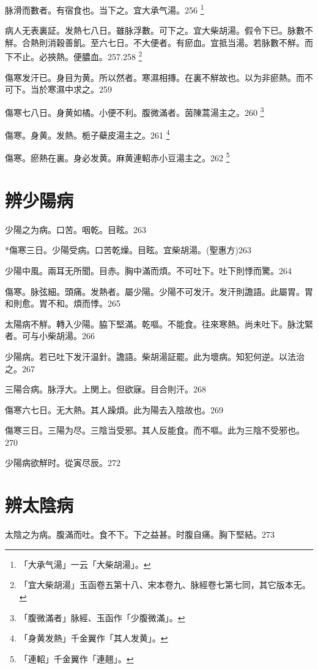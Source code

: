 \documentclass[12pt,twoside,UTF8,b5paper]{ctexbook}
\begin{document}
脉滑而數者。有宿食也。当下之。宜{大}承气湯。256
	\footnote{「大承气湯」一云「大柴胡湯」。}

病人无表裏証。发熱七八日。雖脉浮數。可下之。{宜大柴胡湯。}假令下已。脉數不觧。合熱則消穀善飢。至六七日。不大便者。有瘀血。宜抵当湯。若脉數不觧。而下不止。必挾熱。便膿血。257.258
	\footnote{「宜大柴胡湯」玉函卷五第十八、宋本卷九、脉經卷七第七同，其它版本无。}

傷寒发汗已。身目为黄。所以然者。寒濕相摶。在裏不觧故也。以为非瘀熱。而不可下。当於寒濕中求之。259

傷寒七八日。身黄如橘。小便不利。腹微滿者。茵陳{蒿}湯主之。260
	\footnote{「腹微滿者」脉經、玉函作「少腹微滿」。}

傷寒。身黄。发熱。栀子蘗皮湯主之。261
	\footnote{「身黄发熱」千金翼作「其人发黄」。}

傷寒。瘀熱在裏。身必发黄。麻黄連軺赤小豆湯主之。262
	\footnote{「連軺」千金翼作「連翹」。}

\chapter{辨少陽病}

少陽之为病。口苦。咽乾。目眩。263

*傷寒三日。少陽受病。口苦乾燥。目眩。宜柴胡湯。(聖惠方)263

少陽中風。兩耳无所聞。目赤。胸中滿而煩。不可吐下。吐下則悸而驚。264

傷寒。脉弦細。頭痛。发熱者。屬少陽。少陽不可发汗。发汗則譫語。此屬胃。胃和則愈。胃不和。煩而悸。265

太陽病不觧。轉入少陽。脇下堅滿。乾嘔。不能食。往來寒熱。尚未吐下。脉沈緊者。可与小柴胡湯。266

{少陽病。}若已吐下发汗温針。{譫語。}柴胡湯証罷。此为壞病。知犯何逆。以法治之。267

三陽合病。脉浮大。上関上。但欲寐。目合則汗。268

傷寒六七日。无大熱。其人躁煩。此为陽去入陰故也。269

傷寒三日。三陽为尽。三陰当受邪。其人反能食。而不嘔。此为三陰不受邪也。270

少陽病欲觧时。從寅尽辰。272

\chapter{辨太陰病}

太陰之为病。腹滿而吐。食不下。下之益甚。时腹自痛。胸下堅結。273
\end{document}
